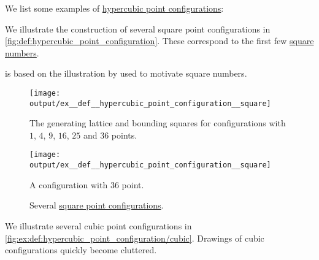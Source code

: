 \begin{example}\label{ex:def:hypercubic_point_configuration}
  We list some examples of \hyperref[def:hypercubic_point_configuration]{hypercubic point configurations}:

  \begin{thmenum}
     We illustrate the construction of several square point configurations in \cref{fig:def:hypercubic_point_configuration}. These correspond to the first few \hyperref[def:hypercubic_number]{square numbers}.

     is based on the illustration by  used to motivate square numbers.

    \begin{figure}[!ht]
      \begin{subcaptionblock}[t]{0.45\textwidth}
        \centering
        \texttt{[image: output/ex\_\_def\_\_hypercubic\_point\_configuration\_\_square]}
        \caption{The generating lattice and bounding squares for configurations with \( 1 \), \( 4 \), \( 9 \), \( 16 \), \( 25 \) and \( 36 \) points.}\label{fig:def:hypercubic_point_configuration/square/squares}
      \end{subcaptionblock}
      \hfill
      \begin{subcaptionblock}[t]{0.45\textwidth}
        \centering
        \texttt{[image: output/ex\_\_def\_\_hypercubic\_point\_configuration\_\_square]}
        \caption{A configuration with \( 36 \) point.}\label{fig:def:hypercubic_point_configuration/square/25}
      \end{subcaptionblock}
      \caption{Several \hyperref[def:hypercubic_point_configuration]{square point configurations}.}\label{fig:def:hypercubic_point_configuration/square}
    \end{figure}

     We illustrate several cubic point configurations in \cref{fig:ex:def:hypercubic_point_configuration/cubic}. Drawings of cubic configurations quickly become cluttered.


\end{thmenum}
\end{example}
